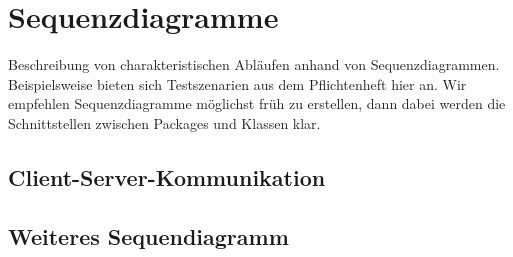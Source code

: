 \section{Sequenzdiagramme}
Beschreibung von charakteristischen Abläufen anhand von Sequenzdiagrammen. Beispielsweise bieten sich Testszenarien aus dem Pflichtenheft hier an. Wir empfehlen Sequenzdiagramme möglichst früh zu erstellen, dann dabei werden die Schnittstellen zwischen Packages und Klassen klar.
\subsection{Client-Server-Kommunikation}
\subsection{Weiteres Sequendiagramm}